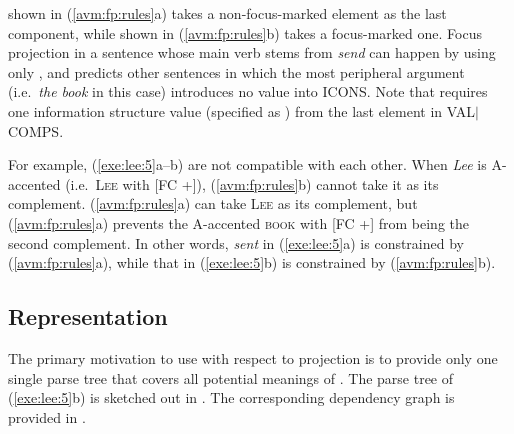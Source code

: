 \noindent {} shown in
(\ref{avm:fp:rules}a) takes a non-focus-marked element as the last
component, while  shown in
(\ref{avm:fp:rules}b) takes a focus-marked one. Focus projection in a
sentence whose main verb stems from \textit{send} can happen by using
only , and 
predicts other sentences in which the most peripheral argument
(i.e.\ \textit{the book} in this case) introduces no 
value into ICONS. Note that
 requires one information structure value
(specified as ) from the last element in
VAL{$\mid$}COMPS.


For example, (\ref{exe:lee:5}a--b) are not compatible with each
other. When \textit{Lee} is A-accented (i.e.\ \textsc{Lee} with [FC
  +]), (\ref{avm:fp:rules}b) cannot take it as its
complement. (\ref{avm:fp:rules}a) can take \textsc{Lee} as its
complement, but (\ref{avm:fp:rules}a) prevents the A-accented
\textsc{book} with [FC +] from being the second complement.  In other
words, \textit{sent} in (\ref{exe:lee:5}a) is constrained by
(\ref{avm:fp:rules}a), while that in (\ref{exe:lee:5}b) is constrained
by (\ref{avm:fp:rules}b).






\subsection{Representation}
\label{10-4:ssec:representation}

  

The primary motivation to use  with respect to 
projection is to provide only one single parse tree that covers all
potential meanings of . The parse tree of
(\ref{exe:lee:5}b) is sketched out in . The corresponding dependency graph is provided
in . 

